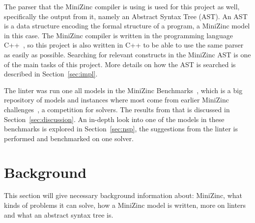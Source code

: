\documentclass[a4paper,12pt]{article}
\begin{document}
The parser that the MiniZinc compiler is using is used for this project as well, specifically
the output from it, namely an Abstract Syntax Tree (AST). An AST is a data structure
encoding the formal structure of a program, a MiniZinc model in this case. The MiniZinc compiler is
written in the programming language C++~\cite{cpp}, so this project is also written in
C++ to be able to use the same parser as easily as possible. Searching for relevant
constructs in the MiniZinc AST is one of the main tasks of this project. More details on
how the AST is searched is described in Section~\ref{sec:impl}.

The linter was run one all models in the MiniZinc Benchmarks~\cite{mznbench}, which is a
big repository of models and instances where most come from earlier MiniZinc
challenges~\cite{MZN:Challenge}, a competition for solvers. The results from that is
discussed in Section~\ref{sec:discussion}. An in-depth look into one of the models in
these benchmarks is explored in Section~\ref{sec:nsp}, the suggestions from the linter is
performed and benchmarked on one solver.

\section{Background}\label{sec:bakgrund}
This section will give necessary background information about: MiniZinc, what kinds of
problems it can solve, how a MiniZinc model is written, more on linters and what
an abstract syntax tree is.

\end{document}

